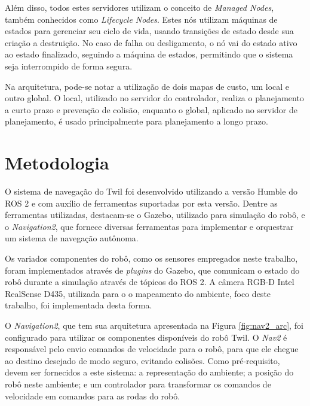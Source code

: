 \documentclass[repeatfields,xlists,xpacks,oneside,yearsonly]{ufrgscca}
\begin{document}
Além disso, todos estes servidores utilizam o conceito de
\textit{Managed Nodes}, também conhecidos como \textit{Lifecycle
    Nodes}. Estes nós utilizam máquinas de estados para gerenciar seu
ciclo de vida, usando transições de estado desde sua criação a
destruição. No caso de falha ou desligamento, o nó vai do estado
ativo ao estado finalizado, seguindo a máquina de estados, permitindo
que o sistema seja interrompido de forma segura.

Na arquitetura, pode-se notar a utilização de dois mapas de custo, um
local e outro global. O local, utilizado no servidor do
controlador, realiza o planejamento a curto prazo e prevenção de
colisão, enquanto o global, aplicado no servidor de
planejamento, é usado principalmente para planejamento a longo prazo.

\chapter{Metodologia}
\label{desenvolvimento}

O sistema de navegação do Twil foi desenvolvido utilizando a versão
Humble do ROS 2 e com auxílio de ferramentas suportadas por esta
versão. Dentre as ferramentas utilizadas, destacam-se o Gazebo,
utilizado para simulação do robô, e o \textit{Navigation2}, que
fornece diversas ferramentas para implementar e orquestrar um sistema
de navegação autônoma.

Os variados componentes do robô, como os sensores empregados neste
trabalho, foram implementados através de \textit{plugins} do Gazebo,
que comunicam o estado do robô durante a simulação através de tópicos
do ROS 2. A câmera RGB-D Intel RealSense D435, utilizada para o o
mapeamento do ambiente, foco deste trabalho, foi implementada desta
forma.

O \textit{Navigation2}, que tem sua arquitetura apresentada na Figura
\ref{fig:nav2_arc}, foi configurado para utilizar os componentes
disponíveis do robô Twil. O \textit{Nav2} é responsável pelo envio
comandos de velocidade para o robô, para que ele chegue ao destino
desejado de modo seguro, evitando colisões. Como pré-requisito, devem
ser fornecidos a este sistema: a representação do ambiente; a posição
do robô neste ambiente; e um controlador para transformar os comandos
de velocidade em comandos para as rodas do robô.
\end{document}
